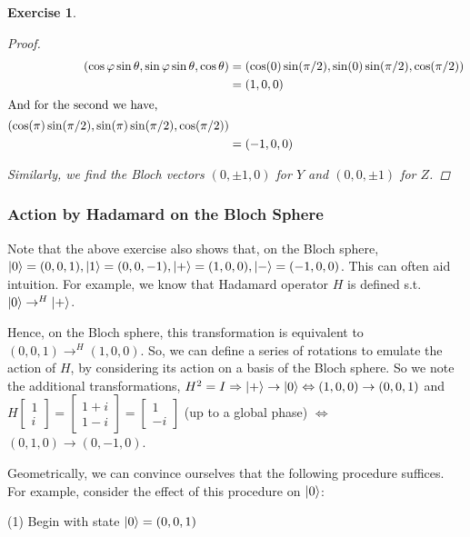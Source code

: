 \documentclass[11pt]{article}
\newcommand\0{\mathbf{0}}
\newcommand\<{\langle}
\renewcommand\>{\rangle}
\renewcommand\iff{\Leftrightarrow}
\renewcommand\phi{\varphi}
\renewcommand\implies{\Rightarrow}
\newtheorem{exercise}[theorem]{Exercise}
\begin{document}
\begin{exercise}
\begin{proof}
	\begin{align*}
	(\cos \phi \sin \theta , \sin \phi \sin \theta, \cos \theta) &= (\cos (0)\sin (\pi / 2) , \sin (0)\sin (\pi / 2) , \cos (\pi / 2) ) \\
	&= (1, 0, 0) \\
	\intertext{And for the second we have,}	
	(\cos (\pi)\sin (\pi / 2) , \sin (\pi)\sin (\pi / 2) , \cos (\pi / 2) ) \\
	&= (-1, 0, 0)
	\end{align*}

Similarly, we find the Bloch vectors $(0, \pm 1, 0)$ for $Y$ and $(0, 0, \pm 1)$ for $Z$.
\end{proof}
\end{exercise}

\subsubsection{Action by Hadamard on the Bloch Sphere}\label{had:bloch}

Note that the above exercise also shows that, on the Bloch sphere, $\ket{0} = (0, 0, 1), \ket{1} = (0, 0 , -1), \ket{+} = (1, 0, 0), \ket{-} = (-1, 0, 0)$. This can often aid intuition. For example, we know that Hadamard operator $H$ is defined s.t. $\ket{0} \rightarrow^{H} \ket{+}$. 

Hence, on the Bloch sphere, this transformation is equivalent to $(0, 0, 1) \rightarrow^{H} (1, 0, 0)$. So, we can define a series of rotations to emulate the action of $H$, by considering its action on a basis of the Bloch sphere. So we note the additional transformations, $H^2 = I \implies \ket{+} \rightarrow \ket{0} \iff (1, 0, 0) \rightarrow (0, 0, 1)$ and $H \begin{bmatrix} 1 \\ i \end{bmatrix} = \begin{bmatrix} 1 + i \\ 1 - i \end{bmatrix} = \begin{bmatrix} 1 \\ -i \end{bmatrix}$ (up to a global phase) $\iff$ $(0, 1, 0) \rightarrow (0, -1, 0)$.

Geometrically, we can convince ourselves that the following procedure suffices. For example, consider the effect of this procedure on $\ket{0}$:

(1) Begin with state $\ket{0} = (0,0,1)$
\end{document}
